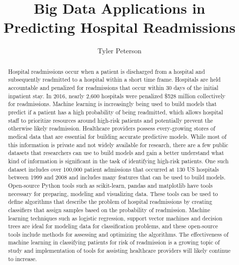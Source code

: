 \documentclass[sigconf]{acmart}
\begin{document}
\title{Big Data Applications in Predicting Hospital Readmissions}

\author{Tyler Peterson}

\renewcommand{\shortauthors}{G. v. Laszewski}

\begin{abstract}

  Hospital readmissions occur when a patient is discharged from a hospital and subsequently readmitted to a hospital within a short time frame. Hospitals are held accountable and penalized for readmissions that occur within 30 days of the initial inpatient stay. In 2016, nearly 2,600 hospitals were penalized \$528 million collectively for readmissions. Machine learning is increasingly being used to build models that predict if a patient has a high probability of being readmitted, which allows hospital staff to prioritize resources around high-risk patients and potentially prevent the otherwise likely readmission. Healthcare providers possess every-growing stores of medical data that are essential for building accurate predictive models. While most of this information is private and not widely available for research, there are a few public datasets that researchers can use to build models and gain a better understand what kind of information is significant in the task of identifying high-risk patients. One such dataset includes over 100,000 patient admissions that occurred at 130 US hospitals between 1999 and 2008 and includes many features that can be used to build models. Open-source Python tools such as scikit-learn, pandas and matplotlib have tools necessary for preparing, modeling and visualizing data. These tools can be used to define algorithms that describe the problem of hospital readmissions by creating classifiers that assign samples based on the probability of readmission. Machine learning techniques such as logistic regression, support vector machines and decision trees are ideal for modeling data for classification problems, and these open-source tools include methods for assessing and optimizing the algorithms. The effectiveness of machine learning in classifying patients for risk of readmission is a growing topic of study and implementation of tools for assisting healthcare providers will likely continue to increase.
 
\end{abstract}
\end{document}

